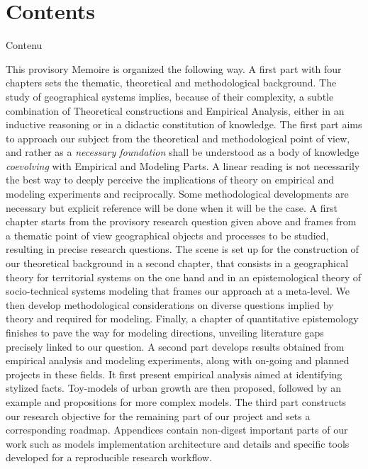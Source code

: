 
\section*{Contents}{Contenu}



This provisory Memoire is organized the following way. A first part with four chapters sets the thematic, theoretical and methodological background. The study of geographical systems implies, because of their complexity, a subtle combination of Theoretical constructions and Empirical Analysis, either in an inductive reasoning or in a didactic constitution of knowledge. The first part aims to approach our subject from the theoretical and methodological point of view, and rather as a \textit{necessary foundation} shall be understood as a body of knowledge \emph{coevolving} with Empirical and Modeling Parts. A linear reading is not necessarily the best way to deeply perceive the implications of theory on empirical and modeling experiments and reciprocally. Some methodological developments are necessary but explicit reference will be done when it will be the case. A first chapter starts from the provisory research question given above and frames from a thematic point of view geographical objects and processes to be studied, resulting in precise research questions. The scene is set up for the construction of our theoretical background in a second chapter, that consists in a geographical theory for territorial systems on the one hand and in an epistemological theory of socio-technical systems modeling that frames our approach at a meta-level. We then develop methodological considerations on diverse questions implied by theory and required for modeling. Finally, a chapter of quantitative epistemology finishes to pave the way for modeling directions, unveiling literature gaps precisely linked to our question. A second part develops results obtained from empirical analysis and modeling experiments, along with on-going and planned projects in these fields. It first present empirical analysis aimed at identifying stylized facts. Toy-models of urban growth are then proposed, followed by an example and propositions for more complex models. The third part constructs our research objective for the remaining part of our project and sets a corresponding roadmap. Appendices contain non-digest important parts of our work such as models implementation architecture and details and specific tools developed for a reproducible research workflow.













  



